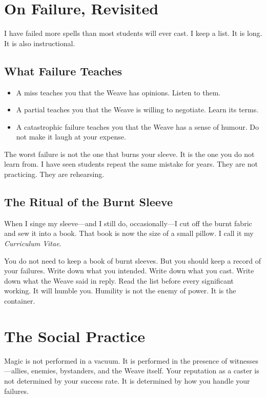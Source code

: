 \section{On Failure, Revisited}

I have failed more spells than most students will ever cast. I keep a list. It is long. It is also instructional.

\subsection{What Failure Teaches}

\begin{itemize}
    \item A miss teaches you that the Weave has opinions. Listen to them.
    \item A partial teaches you that the Weave is willing to negotiate. Learn its terms.
    \item A catastrophic failure teaches you that the Weave has a sense of humour. Do not make it laugh at your expense.
\end{itemize}

The worst failure is not the one that burns your sleeve. It is the one you do not learn from. I have seen students repeat the same mistake for years. They are not practicing. They are rehearsing.

\subsection{The Ritual of the Burnt Sleeve}

When I singe my sleeve---and I still do, occasionally---I cut off the burnt fabric and sew it into a book. That book is now the size of a small pillow. I call it my \emph{Curriculum Vitae}.

You do not need to keep a book of burnt sleeves. But you should keep a record of your failures. Write down what you intended. Write down what you cast. Write down what the Weave said in reply. Read the list before every significant working. It will humble you. Humility is not the enemy of power. It is the container.

\section{The Social Practice}

Magic is not performed in a vacuum. It is performed in the presence of witnesses---allies, enemies, bystanders, and the Weave itself. Your reputation as a caster is not determined by your success rate. It is determined by how you handle your failures.

